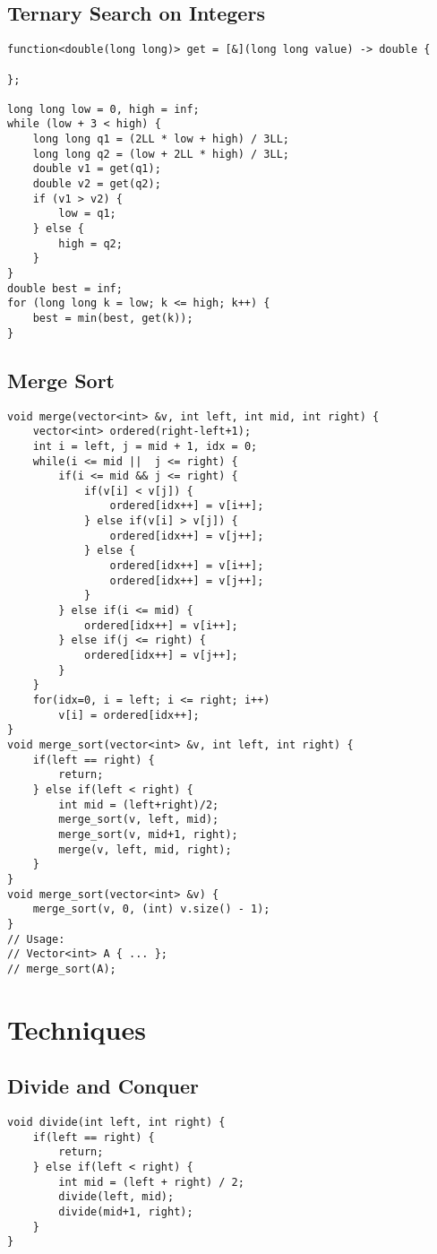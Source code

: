 \documentclass[10pt,letterpaper,twocolumn,twosided]{article}
\begin{document}
\subsection{Ternary Search on Integers}
\begin{lstlisting}
function<double(long long)> get = [&](long long value) -> double {
    
};

long long low = 0, high = inf;
while (low + 3 < high) {
    long long q1 = (2LL * low + high) / 3LL;
    long long q2 = (low + 2LL * high) / 3LL;
    double v1 = get(q1);
    double v2 = get(q2);
    if (v1 > v2) {
        low = q1;
    } else {
        high = q2;
    }
}
double best = inf;
for (long long k = low; k <= high; k++) {
    best = min(best, get(k));
}
\end{lstlisting}

\subsection{Merge Sort}
\begin{lstlisting}
void merge(vector<int> &v, int left, int mid, int right) {
    vector<int> ordered(right-left+1);
    int i = left, j = mid + 1, idx = 0;
    while(i <= mid ||  j <= right) {
        if(i <= mid && j <= right) {
            if(v[i] < v[j]) {
                ordered[idx++] = v[i++];    
            } else if(v[i] > v[j]) {
                ordered[idx++] = v[j++];
            } else {
                ordered[idx++] = v[i++];
                ordered[idx++] = v[j++];
            }
        } else if(i <= mid) {
            ordered[idx++] = v[i++];
        } else if(j <= right) {
            ordered[idx++] = v[j++];
        }
    }
    for(idx=0, i = left; i <= right; i++)
        v[i] = ordered[idx++];
}
void merge_sort(vector<int> &v, int left, int right) {
    if(left == right) {
        return;
    } else if(left < right) {
        int mid = (left+right)/2;
        merge_sort(v, left, mid);
        merge_sort(v, mid+1, right);
        merge(v, left, mid, right);    
    }
}
void merge_sort(vector<int> &v) {
    merge_sort(v, 0, (int) v.size() - 1);
}
// Usage:
// Vector<int> A { ... };
// merge_sort(A);
\end{lstlisting}

\section{Techniques}

\subsection{Divide and Conquer}
\begin{lstlisting}
void divide(int left, int right) {
    if(left == right) {
        return;
    } else if(left < right) {
        int mid = (left + right) / 2;
        divide(left, mid);
        divide(mid+1, right);
    }
}
\end{lstlisting}
\end{document}
